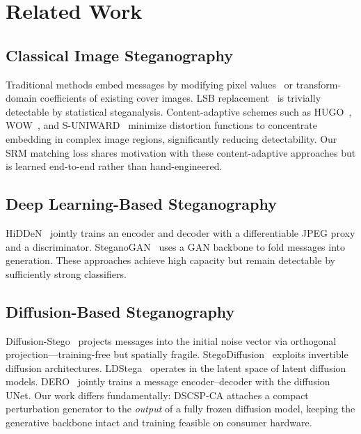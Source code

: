 \documentclass[journal]{IEEEtran}
\begin{document}
\section{Related Work}
\label{sec:related}

\subsection{Classical Image Steganography}

Traditional methods embed messages by modifying pixel values~\cite{cox2007digital} or
transform-domain coefficients of existing cover images.
LSB replacement~\cite{chan2004hiding} is trivially detectable by statistical steganalysis.
Content-adaptive schemes such as HUGO~\cite{pevny2010using}, WOW~\cite{holub2012designing},
and S-UNIWARD~\cite{holub2014universal} minimize distortion functions to concentrate embedding
in complex image regions, significantly reducing detectability.
Our SRM matching loss shares motivation with these content-adaptive approaches but is learned
end-to-end rather than hand-engineered.

\subsection{Deep Learning-Based Steganography}

HiDDeN~\cite{zhu2018hidden} jointly trains an encoder and decoder with a differentiable JPEG
proxy and a discriminator.
SteganoGAN~\cite{zhang2019steganogan} uses a GAN backbone to fold messages into generation.
These approaches achieve high capacity but remain detectable by sufficiently strong classifiers.

\subsection{Diffusion-Based Steganography}

Diffusion-Stego~\cite{wei2023diffusionstego} projects messages into the initial noise vector
via orthogonal projection---training-free but spatially fragile.
StegoDiffusion~\cite{peng2023stegodiffusion} exploits invertible diffusion architectures.
LDStega~\cite{zhang2024ldstega} operates in the latent space of latent diffusion models.
DERO~\cite{zhao2024dero} jointly trains a message encoder--decoder with the diffusion UNet.
Our work differs fundamentally: DSCSP-CA attaches a compact perturbation generator to the
\emph{output} of a fully frozen diffusion model, keeping the generative backbone intact and
training feasible on consumer hardware.
\end{document}
